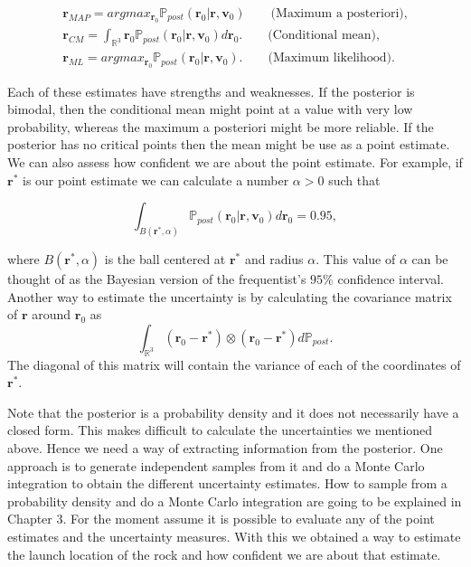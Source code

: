 \documentclass[12pt]{book}
\newcommand{\post}{\mathbb{P}_{post}}
\begin{document}
%
%
\begin{eqnarray}\label{eqnpointestimates}
\textbf{r}_{MAP}=argmax_{\textbf{r}_{0}}\post(\textbf{r}_{0}|\textbf{r},\textbf{v}_{0}) 
\qquad\text{(Maximum a posteriori),}\\
\textbf{r}_{CM}=\int_{\mathbb{R}^{3}}\textbf{r}_{0}\post(\textbf{r}_{0}|\textbf{r},\textbf{v}_{0})d\textbf{r}_{0}.
\qquad\text{(Conditional mean)}, \\
\textbf{r}_{ML}=argmax_{\textbf{r}_{0}}\post(\textbf{r}_{0}|\textbf{r},\textbf{v}_{0}).
\qquad\text{(Maximum likelihood).}
\end{eqnarray}

Each  of these estimates have strengths and weaknesses. If the posterior is bimodal, then the conditional
mean might point at a value with very low probability, whereas the maximum a posteriori might be more 
reliable. If the posterior has no critical points then the mean might be use as a point estimate. We can 
also assess how confident we are about the point estimate. For example, if $\textbf{r}^{*}$ is our point
estimate we can calculate a number $\alpha>0$ such that

\begin{equation*}
\int_{B(\textbf{r}^{*},\alpha)}\post(\textbf{r}_{0}|\textbf{r},\textbf{v}_{0})d\textbf{r}_{0}=0.95,
\end{equation*}

where $B(\textbf{r}^{*},\alpha)$ is the ball centered at $\textbf{r}^{*}$ and radius $\alpha$. This 
value of $\alpha$ can be thought of as  the Bayesian version 
of the frequentist's $95\%$ confidence interval.
Another way to estimate the uncertainty is by calculating the covariance matrix of $\textbf{r}$
around $\textbf{r}_{0}$ as
\begin{equation*}
\int_{\mathbb{R}^{3}}(\textbf{r}_{0}-\textbf{r}^{*})\otimes(\textbf{r}_{0}-\textbf{r}^{*})d\post.
\end{equation*}
\newline
The diagonal of this matrix will  contain the variance of each of the coordinates of $\textbf{r}^{*}$.

Note that the posterior is a probability density and it does not necessarily have a closed form. This
makes difficult to calculate the uncertainties we mentioned above.
Hence we need a way of extracting information from the posterior. One approach is to generate 
independent samples
from it and do a Monte Carlo integration   to obtain the different uncertainty estimates. 
How to sample from a probability 
density and do a Monte Carlo integration are going to be explained in Chapter 3. For the moment
assume it is possible to evaluate any of the point estimates and the uncertainty measures. With 
this we obtained a way to estimate the launch location of the rock and how confident we are
about that estimate. 
\newline
\end{document}
